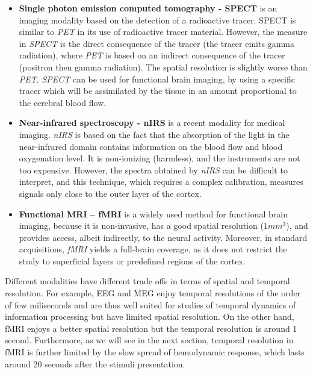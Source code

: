 \begin{itemize}
\item{\bf{Single photon emission computed tomography - SPECT}} is an imaging modality based on the detection of a radioactive tracer. SPECT is similar
to \emph{PET} in its use of radioactive tracer material. However, the
measure in \emph{SPECT} is the direct consequence of the tracer (the tracer
emits gamma radiation), where \emph{PET} is based on an indirect consequence of
the tracer (positron then gamma radiation). The spatial resolution is slightly worse
than \emph{PET}.
%
\emph{SPECT} can be used for functional brain imaging, by using a specific
tracer which will be assimilated by the tissue in an amount proportional to
the cerebral blood flow.


\item{\bf{Near-infrared spectroscopy - nIRS}}
 is a recent modality for
medical imaging. \emph{nIRS} is based on the fact that the absorption of the
light in the
near-infrared domain contains information on the blood flow and blood
oxygenation level. It is non-ionizing (harmless), and the instruments are
not too expensive. However, the spectra obtained by \emph{nIRS} can be difficult
to interpret, and this technique, which requires a complex calibration, measures
signals only close to the outer layer of the cortex.


\item{\bf{Functional MRI} -- {\gls{fMRI}}} is
a widely used method for functional brain imaging, because it is
non-invasive, has a good spatial
resolution ($1mm^3$), and provides access,
albeit indirectly, to the neural activity.
Moreover, in standard acquisitions, \emph{fMRI} yields a
full-brain coverage, as it does not
restrict the study to superficial layers or predefined regions of the cortex.

\end{itemize}


Different modalities have different trade offs in terms of spatial and temporal resolution. For example, EEG and MEG enjoy temporal resolutions of the order of few miliseconds and are thus well suited for studies of temporal dynamics of information processing but have limited spatial resolution. On the other hand, fMRI enjoys a better spatial resolution but the temporal resolution is around 1 second. Furthermore, as we will see in the next section, temporal resolution in fMRI is further limited by the slow spread of hemodynamic response, which lasts around 20 seconds after the stimuli presentation.




